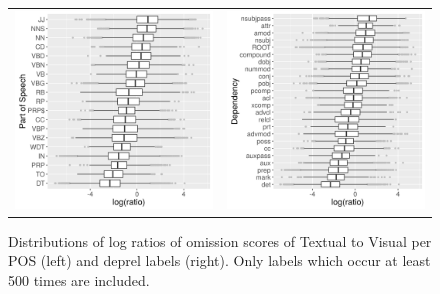 \begin{figure}[t]
  \centering
  \hspace*{-0.2in}
  \setlength{\tabcolsep}{0pt}
  \begin{tabular}{cc}
  \includegraphics[scale=0.55]{imaginet-omission-ratio-pos-boxplot.png} &
  \includegraphics[scale=0.55]{imaginet-omission-ratio-dep-boxplot.png} \\  
  \end{tabular}
  \caption{Distributions of log ratios of omission scores of {\sc Textual} to {\sc Visual} per
    POS (left) and deprel labels (right). Only labels which occur at least 500 times are included.}
\label{fig:omission-imaginet-ratio}
\end{figure}

